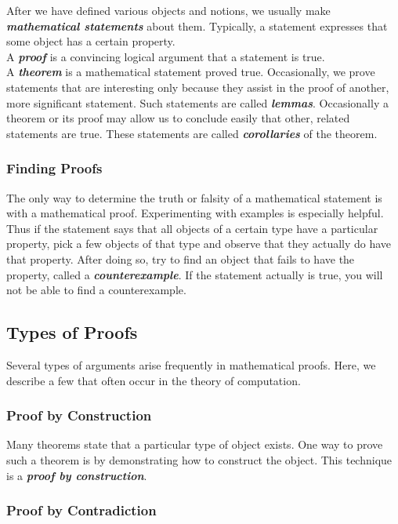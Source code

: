 \documentclass{article}
\newcommand{\define}[1]{\textbf{\textit{#1}}}
\begin{document}
After we have defined various objects and notions, we usually make \define{mathematical statements} about them. Typically, a statement expresses that some object has a certain property. \\

A \define{proof} is a convincing logical argument that a statement is true. \\ 

A \define{theorem} is a mathematical statement proved true. Occasionally, we prove statements that are interesting only because they assist in the proof of another, more significant statement. Such statements are called \define{lemmas}. Occasionally a theorem or its proof may allow us to conclude easily that other, related statements are true. These statements are called \define{corollaries} of the theorem. 

\subsubsection{Finding Proofs}

The only way to determine the truth or falsity of a mathematical statement is with a mathematical proof. Experimenting with examples is especially helpful. Thus if the statement says that all objects of a certain type have a particular property, pick a few objects of that type and observe that they actually do have that property. After doing so, try to find an object that fails to have the property, called a \define{counterexample}. If the statement actually is true, you will not be able to find a counterexample. 

\subsection{Types of Proofs}
Several types of arguments arise frequently in mathematical proofs. Here, we describe a few that often occur in the theory of computation. 

\subsubsection{Proof by Construction}

Many theorems state that a particular type of object exists. One way to prove such a theorem is by demonstrating how to construct the object. This technique is a \define{proof by construction}. 

\subsubsection{Proof by Contradiction}
\end{document}
